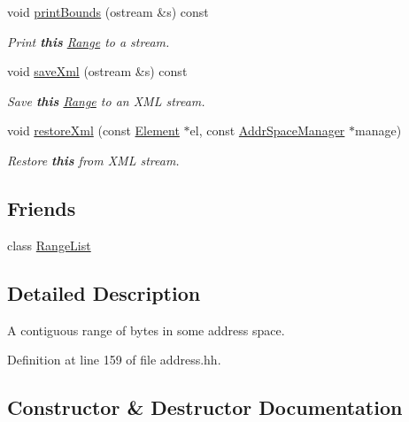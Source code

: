 \begin{DoxyCompactItemize}
void \mbox{\hyperlink{class_range_a6b1d50b9238ca3d02a08c07f81e1b7c5}{print\+Bounds}} (ostream \&s) const
\begin{DoxyCompactList}\small\item\em Print {\bfseries{this}} \mbox{\hyperlink{class_range}{Range}} to a stream. \end{DoxyCompactList}\item 
void \mbox{\hyperlink{class_range_a81bddd68f2b25699cba18e279d67e75c}{save\+Xml}} (ostream \&s) const
\begin{DoxyCompactList}\small\item\em Save {\bfseries{this}} \mbox{\hyperlink{class_range}{Range}} to an X\+ML stream. \end{DoxyCompactList}\item 
void \mbox{\hyperlink{class_range_ad88a42471281f5bc6abf1dc1fb79f12b}{restore\+Xml}} (const \mbox{\hyperlink{class_element}{Element}} $\ast$el, const \mbox{\hyperlink{class_addr_space_manager}{Addr\+Space\+Manager}} $\ast$manage)
\begin{DoxyCompactList}\small\item\em Restore {\bfseries{this}} from X\+ML stream. \end{DoxyCompactList}\end{DoxyCompactItemize}
\subsection*{Friends}
\begin{DoxyCompactItemize}
\item 
class \mbox{\hyperlink{class_range_aefb7602862bfe0af2bf90410672c7c0d}{Range\+List}}
\end{DoxyCompactItemize}


\subsection{Detailed Description}
A contiguous range of bytes in some address space. 

Definition at line 159 of file address.\+hh.



\subsection{Constructor \& Destructor Documentation}
\mbox{\label{class_range_a208021cd8c43af2067942ae261fd833b}} 
